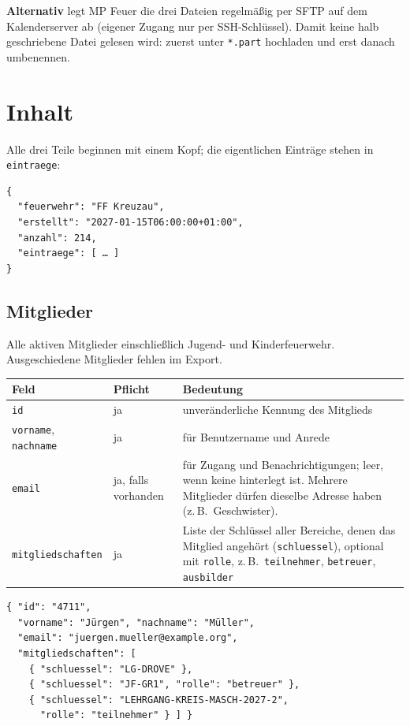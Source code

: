 \documentclass[a4paper,fontsize=10pt]{scrartcl}
\newcommand{\code}[1]{\texttt{#1}}
\begin{document}
\textbf{Alternativ} legt MP Feuer die drei Dateien regelmäßig per SFTP auf dem
Kalenderserver ab (eigener Zugang nur per SSH-Schlüssel). Damit keine halb
geschriebene Datei gelesen wird: zuerst unter \code{*.part} hochladen und erst
danach umbenennen.

\section{Inhalt}

Alle drei Teile beginnen mit einem Kopf; die eigentlichen Einträge stehen in
\code{eintraege}:

\begin{lstlisting}
{
  "feuerwehr": "FF Kreuzau",
  "erstellt": "2027-01-15T06:00:00+01:00",
  "anzahl": 214,
  "eintraege": [ … ]
}
\end{lstlisting}

\subsection{Mitglieder}

Alle aktiven Mitglieder einschließlich Jugend- und Kinderfeuerwehr.
Ausgeschiedene Mitglieder fehlen im Export.

\begin{center}
\begin{tabularx}{\textwidth}{L{3.6cm}L{1.6cm}X}
\toprule
\textbf{Feld} & \textbf{Pflicht} & \textbf{Bedeutung} \\
\midrule
\code{id} & ja & unveränderliche Kennung des Mitglieds \\
\code{vorname}, \code{nachname} & ja & für Benutzername und Anrede \\
\code{email} & ja, falls vorhanden & für Zugang und Benachrichtigungen;
  leer, wenn keine hinterlegt ist. Mehrere Mitglieder dürfen dieselbe
  Adresse haben (z.\,B.\ Geschwister). \\
\code{mitgliedschaften} & ja & Liste der Schlüssel aller Bereiche, denen das
  Mitglied angehört (\code{schluessel}), optional mit \code{rolle}, z.\,B.\
  \code{teilnehmer}, \code{betreuer}, \code{ausbilder} \\
\bottomrule
\end{tabularx}
\end{center}

\begin{lstlisting}
{ "id": "4711",
  "vorname": "Jürgen", "nachname": "Müller",
  "email": "juergen.mueller@example.org",
  "mitgliedschaften": [
    { "schluessel": "LG-DROVE" },
    { "schluessel": "JF-GR1", "rolle": "betreuer" },
    { "schluessel": "LEHRGANG-KREIS-MASCH-2027-2",
      "rolle": "teilnehmer" } ] }
\end{lstlisting}
\end{document}
